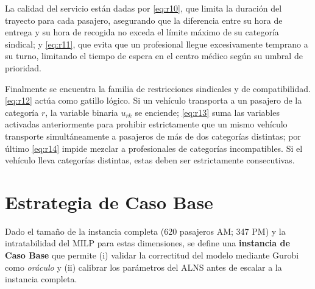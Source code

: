 La calidad del servicio están dadas por \protect\eqref{eq:r10}, que limita la duración del trayecto para cada pasajero, asegurando que la diferencia entre su hora de entrega y su hora de recogida no exceda el límite máximo de su categoría sindical; y \protect\eqref{eq:r11}, que evita que un profesional llegue excesivamente temprano a su turno, limitando el tiempo de espera en el centro médico según su umbral de prioridad.

Finalmente se encuentra la familia de restricciones sindicales y de compatibilidad. \protect\eqref{eq:r12} actúa como gatillo lógico. Si un vehículo transporta a un pasajero de la categoría $r$, la variable binaria $u_{rk}$ se enciende; \protect\eqref{eq:r13} suma las variables activadas anteriormente para prohibir estrictamente que un mismo vehículo transporte simultáneamente a pasajeros de más de dos categorías distintas; por último \protect\eqref{eq:r14} impide mezclar a profesionales de categorías incompatibles. Si el vehículo lleva categorías distintas, estas deben ser estrictamente consecutivas.







\section{Estrategia de Caso Base}
\label{sec:casobase}

Dado el tamaño de la instancia completa (620 pasajeros AM; 347 PM) y la intratabilidad del MILP para estas dimensiones, se define una \textbf{instancia de Caso Base} que permite (i) validar la correctitud del modelo mediante Gurobi como \textit{oráculo} y (ii) calibrar los parámetros del ALNS antes de escalar a la instancia completa.

